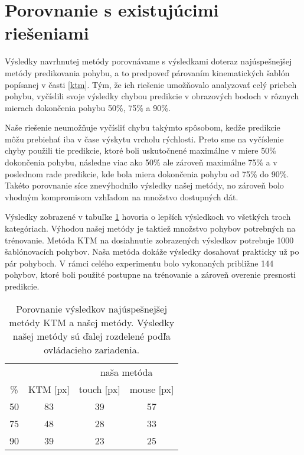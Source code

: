 \section{Porovnanie s existujúcimi riešeniami}
Výsledky navrhnutej metódy porovnávame s výsledkami doteraz najúspešnejšej metódy predikovania pohybu, a to predpoveď párovaním kinematických šablón popísanej v časti \ref{ktm}. Tým, že ich riešenie umožňovalo analyzovať celý priebeh pohybu, vyčíslili svoje výsledky chybou predikcie v obrazových bodoch v rôznych mierach dokončenia pohybu 50\%, 75\% a 90\%. 

Naše riešenie neumožňuje vyčísliť chybu takýmto spôsobom, kedže predikcie môžu prebiehať iba v čase výskytu vrcholu rýchlosti. Preto sme na vyčíslenie chyby použili tie predikcie, ktoré boli uskutočnené maximálne v miere 50\% dokončenia pohybu, následne viac ako 50\% ale zároveň maximálne 75\% a v poslednom rade predikcie, kde bola miera dokončenia pohybu od 75\% do 90\%. Takéto porovnanie síce znevýhodnilo výsledky našej metódy, no zároveň bolo vhodným kompromisom vzhľadom na množstvo dostupných dát.

Výsledky zobrazené v tabuľke \ref{tab:ktm-looser} hovoria o lepších výsledkoch vo všetkých troch kategóriach. Výhodou našej metódy je taktiež množstvo pohybov potrebných na trénovanie. Metóda KTM na dosiahnutie zobrazených výsledkov potrebuje 1000 šablónovacích pohybov. Naša metóda dokáže výsledky dosahovať prakticky už po pár pohyboch. V rámci celého experimentu bolo vykonaných približne 144 pohybov, ktoré boli použité postupne na trénovanie a zároveň overenie presnosti predikcie.

\begin{table}[]
\centering
\begin{tabular}{cccc}
   &              & \multicolumn{2}{c}{naša metóda} \\
\% & KTM {[}px{]} & touch {[}px{]} & mouse {[}px{]} \\ \hline
50 & 83           & 39             & 57             \\
75 & 48           & 28             & 33             \\
90 & 39           & 23             & 25            
\end{tabular}
\caption{Porovnanie výsledkov najúspešnejšej metódy KTM a našej metódy. Výsledky našej metódy sú ďalej rozdelené podľa ovládacieho zariadenia.\label{tab:ktm-looser}}
\end{table}


